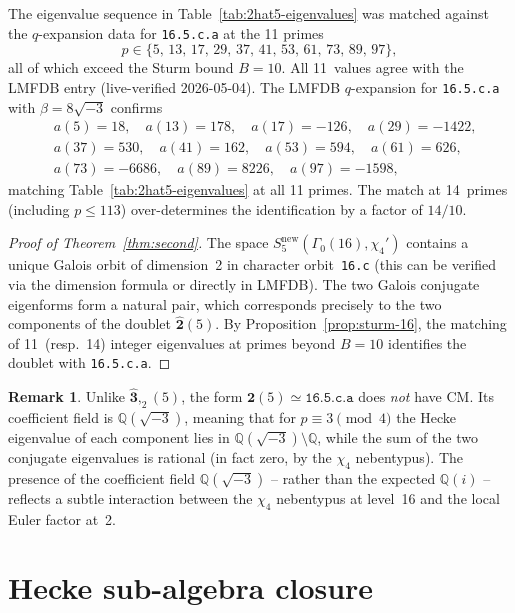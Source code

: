 \documentclass[12pt]{amsart}
\theoremstyle{definition}
\newtheorem{remark}[theorem]{Remark}
\newcommand{\Q}{\mathbb{Q}}
\newcommand{\Gam}{\Gamma}
\newcommand{\lmfdb}[1]{\texttt{#1}}  %
\newcommand{\hhat}[1]{\widehat{\mathbf{#1}}}  %
\begin{document}
The eigenvalue sequence in Table~\ref{tab:2hat5-eigenvalues}
was matched against the $q$-expansion data for \lmfdb{16.5.c.a}
at the 11 primes
\[
  p\in\{5,\,13,\,17,\,29,\,37,\,41,\,53,\,61,\,73,\,89,\,97\},
\]
all of which exceed the Sturm bound $B=10$.
All 11~values agree with the LMFDB entry (live-verified 2026-05-04).
The LMFDB $q$-expansion for \lmfdb{16.5.c.a} with $\beta=8\sqrt{-3}$
confirms
\begin{align*}
  &a(5)=18,\quad a(13)=178,\quad a(17)=-126,\quad a(29)=-1422,\\
  &a(37)=530,\quad a(41)=162,\quad a(53)=594,\quad a(61)=626,\\
  &a(73)=-6686,\quad a(89)=8226,\quad a(97)=-1598,
\end{align*}
matching Table~\ref{tab:2hat5-eigenvalues} at all 11 primes.
The match at 14~primes (including $p\le 113$) over-determines the
identification by a factor of $14/10$.

\begin{proof}[Proof of Theorem~\ref{thm:second}]
  The space $S_5^{\mathrm{new}}(\Gam_0(16),\chi_4')$ contains a unique
  Galois orbit of dimension~2 in character orbit~\texttt{16.c}
  (this can be verified via the dimension formula or directly in LMFDB).
  The two Galois conjugate eigenforms form a natural pair, which
  corresponds precisely to the two components of the doublet
  $\hhat{2}(5)$.  By Proposition~\ref{prop:sturm-16}, the matching
  of 11~(resp.\ 14) integer eigenvalues at primes beyond $B=10$
  identifies the doublet with \lmfdb{16.5.c.a}.
\end{proof}

\begin{remark}
  Unlike $\hhat{3},_2(5)$, the form $\hhat{2}(5) \simeq \lmfdb{16.5.c.a}$
  does \emph{not} have CM.  Its coefficient field is $\Q(\sqrt{-3})$,
  meaning that for $p\equiv 3\pmod{4}$ the Hecke eigenvalue of each
  component lies in $\Q(\sqrt{-3})\setminus\Q$, while the sum of
  the two conjugate eigenvalues is rational (in fact zero, by
  the $\chi_4$ nebentypus).
  The presence of the coefficient field $\Q(\sqrt{-3})$ -- rather
  than the expected $\Q(i)$ -- reflects a subtle interaction between
  the $\chi_4$ nebentypus at level~16 and the local Euler factor at~2.
\end{remark}

\section{Hecke sub-algebra closure}
\label{sec:closure}
\end{document}
